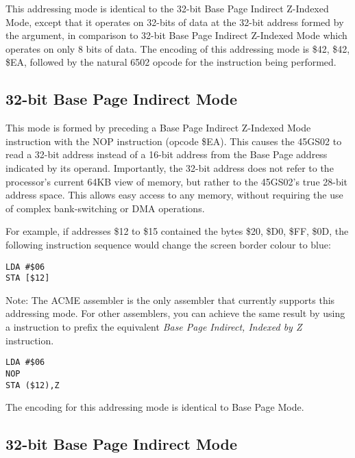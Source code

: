 This addressing mode is identical to the 32-bit Base Page Indirect Z-Indexed Mode,
except that it operates on 32-bits of data at the 32-bit address formed by the argument,
in comparison to 32-bit Base Page Indirect Z-Indexed Mode which operates on only 8 bits
of data.   The encoding of this addressing mode is \$42, \$42, \$EA, followed by the
natural 6502 opcode for the instruction being performed.


\subsection{32-bit Base Page Indirect Mode}

This mode is formed by preceding a Base Page Indirect Z-Indexed Mode instruction with
the {NOP} instruction (opcode \$EA).  This causes the 45GS02 to read a 32-bit address instead
of a 16-bit address from the Base Page address indicated by its operand.
Importantly, the 32-bit address does not refer to the processor's current 64KB
view of memory, but rather to the 45GS02's true 28-bit address space. This allows easy access
to any memory, without requiring the use of complex bank-switching or DMA operations.

For example, if addresses \$12 to \$15 contained the bytes \$20, \$D0, \$FF, \$0D,
the following instruction sequence would change the screen border colour to blue:

\begin{tcolorbox}[colback=black,coltext=white]
\verbatimfont{\codefont}
\begin{verbatim}
LDA #$06
STA [$12]
\end{verbatim}
\end{tcolorbox}

Note: The ACME assembler is the only assembler that currently supports this addressing mode.
For other assemblers, you can achieve the same result by using a  instruction to
prefix the equivalent {\em Base Page Indirect, Indexed by Z} instruction.

\begin{tcolorbox}[colback=black,coltext=white]
\verbatimfont{\codefont}
\begin{verbatim}
LDA #$06
NOP
STA ($12),Z
\end{verbatim}
\end{tcolorbox}


The encoding for this addressing mode is identical to Base Page Mode.

\subsection{32-bit Base Page Indirect Mode}

